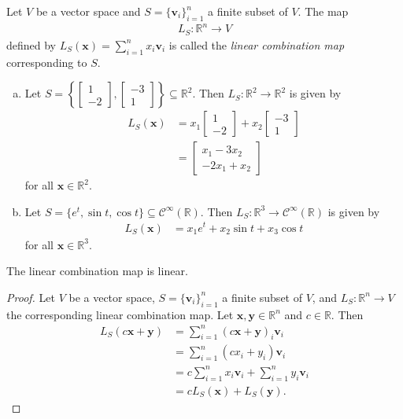 \documentclass[12pt,letterpaper,reqno]{article}
\numberwithin{equation}{section}
\newcommand{\R}{\ensuremath{\mathbb R}}
\begin{document}
\begin{defn}
	Let $V$ be a vector space and $S=\{\mathbf{v}_i\}_{i=1}^n$ a finite subset of $V$. The map 
	\begin{align*}
		L_S:\R^n \to V
	\end{align*}
	defined by $L_S(\mathbf{x})=\sum_{i=1}^nx_i\mathbf{v}_i$ is called the \emph{linear combination map} corresponding to $S$.
\end{defn}

\begin{example}
\begin{enumerate}[(a)]
	\item Let $S=\left\{\begin{bmatrix}
	1 \\ -2 
\end{bmatrix}, \begin{bmatrix}
	-3 \\ 1
\end{bmatrix} \right\} \subseteq \R^2$. Then $L_S:\R^2 \to \R^2$ is given by 
\begin{align*}
	L_S(\mathbf{x})&=x_1\begin{bmatrix}
	1 \\ -2 
\end{bmatrix}+x_2\begin{bmatrix}
	-3 \\ 1
\end{bmatrix} \\
&=\begin{bmatrix}
	x_1-3x_2 \\ -2x_1+x_2
\end{bmatrix}
\end{align*}	
for all $\mathbf{x} \in \R^2$.
\item Let $S=\{e^t,\sin t, \cos t\} \subseteq \mathscr{C}^\infty(\R)$. Then $L_S:\R^3 \to \mathscr{C}^\infty(\R)$ is given by
	\begin{align*}
		L_S(\mathbf{x})&=x_1e^t+x_2\sin t+x_3\cos t
	\end{align*}
	for all $\mathbf{x} \in \R^3$.
\end{enumerate}
\end{example}

\begin{prop}
	The linear combination map is linear.
\end{prop}

\begin{proof}
	Let $V$ be a vector space, $S=\{\mathbf{v}_i\}_{i=1}^n$ a finite subset of $V$, and $L_S:\R^n \to V$ the corresponding linear combination map. Let $\mathbf{x}, \mathbf{y} \in \R^n$ and $c \in \R$. Then
	\begin{align*}
		L_S(c\mathbf{x}+\mathbf{y})&=\sum_{i=1}^n(c\mathbf{x}+\mathbf{y})_i\mathbf{v}_i \\
		&=\sum_{i=1}^n(cx_i+y_i)\mathbf{v}_i \\
		&=c\sum_{i=1}^nx_i\mathbf{v}_i+\sum_{i=1}^ny_i\mathbf{v}_i \\
		&=cL_S(\mathbf{x})+L_S(\mathbf{y}).
	\end{align*}
\end{proof}
\end{document}
